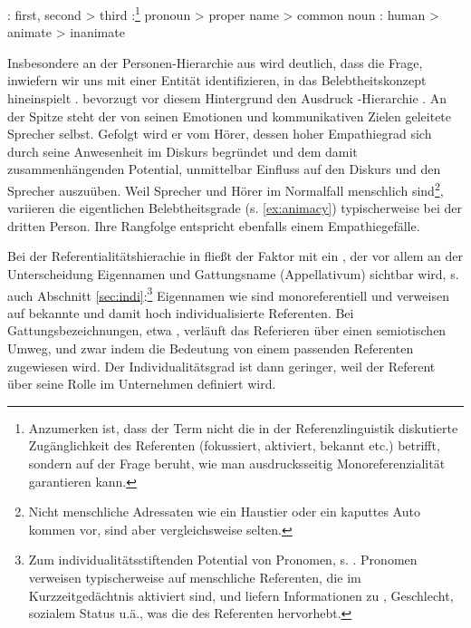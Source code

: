 \begin{exe}
	\ex \label{ex:croft}
	\begin{xlist}
		\ex \label{ex:person} : first, second > third
		\ex \label{ex:referenz} :\footnote{Anzumerken ist, dass der Term   nicht die in der Referenzlinguistik diskutierte Zugänglichkeit des Referenten (fokussiert, aktiviert, bekannt etc.) \parencite[vgl. etwa][]{Gundel1993} betrifft, sondern  auf der Frage beruht, wie man ausdrucksseitig Monoreferenzialität garantieren kann.} pronoun > proper name > common noun
		\ex \label{ex:animacy} : human > animate > inanimate
	\end{xlist}
\end{exe}
\noindent
Insbesondere an der Personen-Hierarchie aus  wird deutlich, dass die Frage, inwiefern wir uns mit einer Entität identifizieren, in das Belebtheitskonzept  hineinspielt \parencite[10--11 u. 25--26]{Yamamoto1999}. \textcite[307--308]{Langacker1991} bevorzugt vor diesem Hintergrund den Ausdruck -Hierarchie \parencite[ebenso][]{Lehmann2004a}. An der Spitze steht der von seinen Emotionen und kommunikativen Zielen geleitete Sprecher selbst. Gefolgt wird er vom Hörer, dessen hoher Empathiegrad sich durch seine Anwesenheit im Diskurs begründet und dem damit zusammenhängenden Potential, unmittelbar Einfluss auf den Diskurs und den Sprecher auszuüben.  Weil Sprecher und Hörer im Normalfall menschlich sind\footnote{Nicht menschliche Adressaten wie ein Haustier oder ein kaputtes Auto kommen vor, sind aber vergleichsweise selten.}, variieren die eigentlichen Belebtheitsgrade   (s. \ref{ex:animacy}) typischerweise bei der dritten Person. Ihre Rangfolge entspricht ebenfalls einem Empathiegefälle. 

Bei der Referentialitätshierachie  in  fließt der Faktor  mit ein \parencite{Timberlake1977,Hopper1980,Dahl1996,Fraurud1996,Yamamoto1999}, der vor allem an der Unterscheidung Eigennamen  und Gattungsname  (Appellativum) sichtbar wird, s. auch Abschnitt \ref{sec:indi}:\footnote{Zum individualitätsstiftenden  Potential von  Pronomen, s. \textcite[29--31]{Yamamoto1999}. Pronomen  verweisen typischerweise auf menschliche Referenten, die im Kurzzeitgedächtnis aktiviert sind, und liefern Informationen zu , Geschlecht, sozialem Status u.ä., was die  des Referenten hervorhebt.} Eigennamen  wie  sind monoreferentiell und verweisen auf bekannte und damit hoch individualisierte  Referenten. Bei  Gattungsbezeichnungen, etwa , verläuft das Referieren über einen semiotischen Umweg, und zwar indem die Bedeutung von  einem passenden Referenten zugewiesen wird. Der Individualitätsgrad  ist dann geringer, weil der Referent über seine Rolle im Unternehmen definiert wird.

